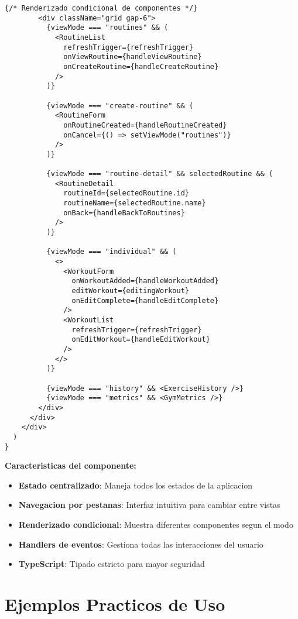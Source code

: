 \documentclass[12pt,a4paper]{article}
\begin{document}
\begin{lstlisting}[caption=app/gym/page.tsx - Estructura completa]
        {/* Renderizado condicional de componentes */}
        <div className="grid gap-6">
          {viewMode === "routines" && (
            <RoutineList
              refreshTrigger={refreshTrigger}
              onViewRoutine={handleViewRoutine}
              onCreateRoutine={handleCreateRoutine}
            />
          )}

          {viewMode === "create-routine" && (
            <RoutineForm 
              onRoutineCreated={handleRoutineCreated} 
              onCancel={() => setViewMode("routines")} 
            />
          )}

          {viewMode === "routine-detail" && selectedRoutine && (
            <RoutineDetail
              routineId={selectedRoutine.id}
              routineName={selectedRoutine.name}
              onBack={handleBackToRoutines}
            />
          )}

          {viewMode === "individual" && (
            <>
              <WorkoutForm
                onWorkoutAdded={handleWorkoutAdded}
                editWorkout={editingWorkout}
                onEditComplete={handleEditComplete}
              />
              <WorkoutList 
                refreshTrigger={refreshTrigger} 
                onEditWorkout={handleEditWorkout} 
              />
            </>
          )}

          {viewMode === "history" && <ExerciseHistory />}
          {viewMode === "metrics" && <GymMetrics />}
        </div>
      </div>
    </div>
  )
}
\end{lstlisting}

\textbf{Caracteristicas del componente:}
\begin{itemize}
    \item \textbf{Estado centralizado}: Maneja todos los estados de la aplicacion
    \item \textbf{Navegacion por pestanas}: Interfaz intuitiva para cambiar entre vistas
    \item \textbf{Renderizado condicional}: Muestra diferentes componentes segun el modo
    \item \textbf{Handlers de eventos}: Gestiona todas las interacciones del usuario
    \item \textbf{TypeScript}: Tipado estricto para mayor seguridad
\end{itemize}

\section{Ejemplos Practicos de Uso}
\end{document}
